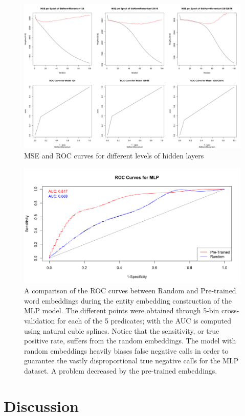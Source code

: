 \documentclass[11.5pt]{article}
\newcounter{graphics}
\begin{document}
\begin{figure}[h!]
  \includegraphics[width=1\textwidth]{report_mlp/different_layers_MSE_ROC.png}
    \caption{\small MSE and ROC curves for different levels of hidden layers}
    \label{different_layers_MSE_ROC.png}
\end{figure}



\begin{figure}[h!]
 \includegraphics[width=1\textwidth]{report_mlp/CV-ROC.png}
  \caption{\small A comparison of the ROC curves between Random and Pre-trained word embeddings during the entity embedding construction of the MLP model. The different points were obtained through 5-bin cross-validation for each of the 5 predicates; with the AUC is computed using natural cubic splines. Notice that the sensitivity, or true positive rate, suffers from the random embeddings. The model with random embeddings heavily biases false negative calls in order to guarantee the vastly disproportional true negative calls for the MLP dataset. A problem decreased by the pre-trained embeddings.}
 \label{CV-ROC}
\end{figure}


\section{Discussion}


{}
\end{document}
